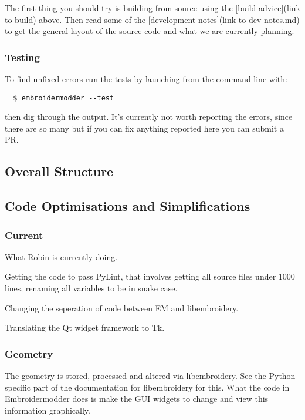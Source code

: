\documentclass[a4paper, 11pt]{report}
\begin{document}
The first thing you should try is building from source using the [build advice](link to build)
above. Then read some of the [development notes](link to dev notes.md) to get the general
layout of the source code and what we are currently planning.

\subsubsection{Testing}

To find unfixed errors run the tests by launching from the command line with:

\begin{verbatim}
  $ embroidermodder --test
\end{verbatim}

then dig through the output. It's currently not worth reporting the errors, since
there are so many but if you can fix anything reported here you can submit a PR.

\subsection{Overall Structure}

\subsection{Code Optimisations and Simplifications}

\subsubsection{Current}

What Robin is currently doing.

Getting the code to pass PyLint, that involves getting all source files
under 1000 lines, renaming all variables to be in snake case.

Changing the seperation of code between EM and libembroidery.

Translating the Qt widget framework to Tk.

\subsubsection{Geometry}

The geometry is stored, processed and altered via libembroidery. See the Python specific part of the documentation for libembroidery for this. What the code in Embroidermodder does is make the GUI widgets to change and view this information graphically.
\end{document}
